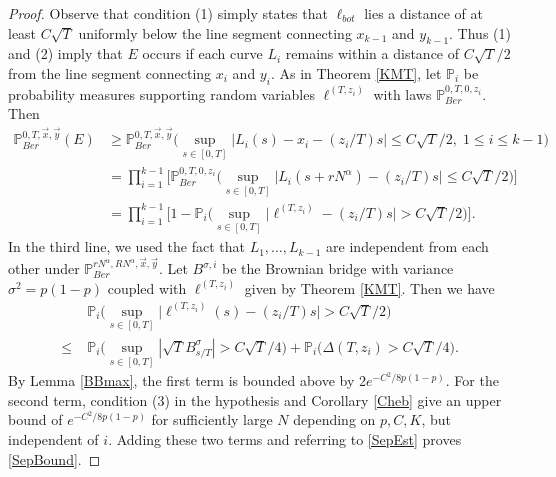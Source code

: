 \begin{proof}
	Observe that condition (1) simply states that $\ell_{bot}$ lies a distance of at least $C\sqrt{T}$ uniformly below the line segment connecting $x_{k-1}$ and $y_{k-1}$. Thus (1) and (2) imply that $E$ occurs if each curve $L_i$ remains within a distance of $C\sqrt{T}/2$ from the line segment connecting $x_i$ and $y_i$. As in Theorem \ref{KMT}, let $\mathbb{P}_i$ be probability measures supporting random variables $\ell^{(T,z_i)}$ with laws $\mathbb{P}^{0,T,0,z_i}_{Ber}$. Then
	\begin{align}
	\mathbb{P}^{0, T,\vec{x},\vec{y}}_{Ber} (E) &\geq \mathbb{P}^{0,T,\vec{x},\vec{y}}_{Ber} \Big(\sup_{s\in[0,T]} \big|L_i(s) - x_i - (z_i/T)s\big| \leq C\sqrt{T}/2, \;1\leq i\leq k-1\Big) \nonumber\\
	&= \prod_{i=1}^{k-1}\Big[ \mathbb{P}^{0,T,0,z_i}_{Ber} \Big(\sup_{s\in[0,T]} \big|L_i(s+rN^\alpha) - (z_i/T)s\big| \leq C\sqrt{T}/2\Big)\Big] \nonumber\\
	&= \prod_{i=1}^{k-1}\Big[ 1 - \mathbb{P}_i\Big(\sup_{s\in[0,T]} \big|\ell^{(T,z_i)} - (z_i/T)s\big| > C\sqrt{T}/2\Big)\Big]. \label{SepEst}
	\end{align}
	In the third line, we used the fact that $L_1,\dots,L_{k-1}$ are independent from each other under $\mathbb{P}^{rN^\alpha, RN^\alpha,\vec{x},\vec{y}}_{Ber}$. Let $B^{\sigma,i}$ be the Brownian bridge with variance $\sigma^2 = p(1-p)$ coupled with $\ell^{(T,z_i)}$ given by Theorem \ref{KMT}. Then we have
	\begin{align*}
	&\mathbb{P}_i \Big(\sup_{s\in[0,T]} \big|\ell^{(T,z_i)}(s) - (z_i/T)s\big| > C\sqrt{T}/2\Big)\\
	\leq \; & \mathbb{P}_i\Big(\sup_{s\in[0,T]} |\sqrt{T}B^{\sigma}_{s/T}| > C\sqrt{T}/4\Big) + \mathbb{P}_i\Big(\Delta(T,z_i) > C\sqrt{T}/4\Big).
	\end{align*}
	By Lemma \ref{BBmax}, the first term is bounded above by $2e^{-C^2/8p(1-p)}$. For the second term, condition (3) in the hypothesis and Corollary \ref{Cheb} give an upper bound of $e^{-C^2/8p(1-p)}$ for sufficiently large $N$ depending on $p,C,K$, but independent of $i$. Adding these two terms and referring to \eqref{SepEst} proves \eqref{SepBound}.
\end{proof}


%
